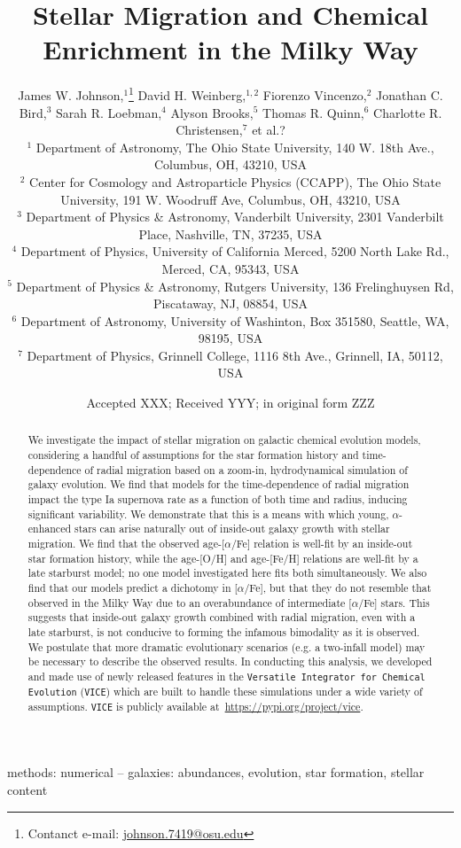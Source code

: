 \documentclass[fleqn, usenatbib]{mnras}
\title{Stellar Migration and Chemical Enrichment in the Milky Way}
\author[J.W. Johnson et al.]{
	James W. Johnson,$^{1}$\thanks{Contanct e-mail: \href{mailto:
	johnson.7419@osu.edu}{johnson.7419@osu.edu}} 
	David H. Weinberg,$^{1, 2}$ 
	Fiorenzo Vincenzo,$^{2}$ 
	Jonathan C. Bird,$^{3}$ 
	\newauthor 
	Sarah R. Loebman,$^{4}$ 
	Alyson Brooks,$^{5}$ 
	Thomas R. Quinn,$^{6}$ 
	Charlotte R. Christensen,$^{7}$ 
	\newauthor 
	et al.?
	\\
	$^{1}$ Department of Astronomy, The Ohio State University, 
	140 W. 18th Ave., Columbus, OH, 43210, USA 
	\\ 
	$^{2}$ Center for Cosmology and Astroparticle Physics (CCAPP), 
	The Ohio State University, 191 W. Woodruff Ave, Columbus, OH, 43210, USA 
	\\ 
	$^{3}$ Department of Physics \& Astronomy, Vanderbilt University, 
	2301 Vanderbilt Place, Nashville, TN, 37235, USA 
	\\ 
	$^{4}$ Department of Physics, University of California Merced, 
	5200 North Lake Rd., Merced, CA, 95343, USA 
	\\ 
	$^{5}$ Department of Physics \& Astronomy, Rutgers University, 136 
	Frelinghuysen Rd, Piscataway, NJ, 08854, USA 
	\\ 
	$^{6}$ Department of Astronomy, University of Washinton, Box 351580, 
	Seattle, WA, 98195, USA 
	\\ 
	$^{7}$ Department of Physics, Grinnell College, 1116 8th Ave., Grinnell, 
	IA, 50112, USA 
}
\date{Accepted XXX; Received YYY; in original form ZZZ}
\begin{document}
 
\label{firstpage} 
\pagerange{\pageref{firstpage}--\pageref{lastpage}} 
\maketitle 

\begin{abstract} 
We investigate the impact of stellar migration on galactic chemical evolution 
models, considering a handful of assumptions for the star formation history 
and time-dependence of radial migration based on a zoom-in, hydrodynamical 
simulation of galaxy evolution. We find that models for the 
time-dependence of radial migration impact the type Ia supernova rate as a 
function of both time and radius, inducing significant variability. We 
demonstrate that this is a means with which young, $\alpha$-enhanced stars can 
arise naturally out of inside-out galaxy growth with stellar migration. We find 
that the observed age-[$\alpha$/Fe] relation is well-fit by an inside-out star 
formation history, while the age-[O/H] and age-[Fe/H] relations are well-fit by 
a late starburst model; no one model investigated here fits both 
simultaneously. We also find that our models predict a dichotomy in 
[$\alpha$/Fe], but that they do not resemble that observed in the Milky Way 
due to an overabundance of intermediate [$\alpha$/Fe] stars. This suggests 
that inside-out galaxy growth combined with radial migration, even with a late 
starburst, is not conducive to forming the infamous bimodality as it is 
observed. We postulate that more dramatic evolutionary scenarios (e.g. a 
two-infall model) may be necessary to describe the observed results. In 
conducting this analysis, we developed and made use of newly released features 
in the \texttt{Versatile Integrator for Chemical Evolution} (\texttt{VICE}) 
which are built to handle these simulations under a wide variety of 
assumptions. \texttt{VICE} is publicly available 
at~\url{https://pypi.org/project/vice}. 
\end{abstract} 

\begin{keywords} 
methods: numerical -- galaxies: abundances, evolution, star formation, stellar 
content 
\end{keywords} 
\end{document}
